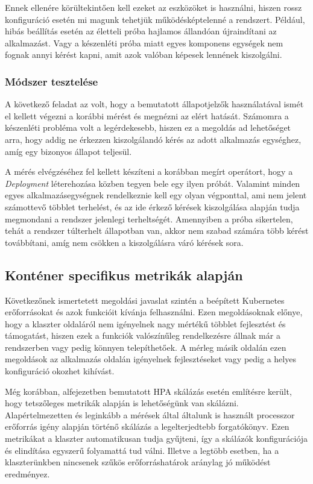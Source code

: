 Ennek ellenére körültekintően kell ezeket az eszközöket is használni, hiszen rossz konfiguráció esetén mi magunk tehetjük működésképtelenné a rendszert.
Például, hibás beállítás esetén az életteli próba hajlamos állandóan újraindítani az alkalmazást. Vagy a készenléti próba miatt egyes komponens egységek nem fognak annyi kérést kapni, amit azok valóban képesek lennének kiszolgálni.

\subsubsection{Módszer tesztelése}
A következő feladat az volt, hogy a bemutatott állapotjelzők használatával ismét el kellett végezni a korábbi mérést és megnézni az elért hatását.
Számomra a készenléti probléma volt a legérdekesebb, hiszen ez a megoldás ad lehetőséget arra, hogy addig ne érkezzen kiszolgálandó kérés az adott alkalmazás egységhez, amíg egy bizonyos állapot teljesül.

A mérés elvégzéséhez fel kellett készíteni a korábban megírt operátort, hogy a \textit{Deployment} léterehozása közben tegyen bele egy ilyen próbát. 
Valamint minden egyes alkalmazásegységnek rendelkeznie kell egy olyan végponttal, ami nem jelent számottevő többlet terhelést, és az ide érkező kérések kiszolgálása alapján tudja megmondani a rendszer jelenlegi terheltségét. 
Amennyiben a próba sikertelen, tehát a rendszer túlterhelt állapotban van, akkor nem szabad számára több kérést továbbítani, amíg nem csökken a kiszolgálásra váró kérések sora.


\subsection{Konténer specifikus metrikák alapján}
\label{subsec:container_metric_scaling}
Következőnek ismertetett megoldási javaslat szintén a beépített Kubernetes erőforrásokat és azok funkcióit kívánja felhasználni.
Ezen megoldásoknak előnye, hogy a klaszter oldaláról nem igényelnek nagy mértékű többlet fejlesztést és támogatást, hiszen ezek a funkciók valószínűleg rendelkezésre állnak már a rendszerben vagy pedig könnyen telepíthetőek.
A mérleg másik oldalán ezen megoldások az alkalmazás oldalán igényelnek fejlesztéseket vagy pedig a helyes konfiguráció okozhet kihívást.

Még korábban,  alfejezetben bemutatott HPA skálázás esetén említésre került, hogy tetszőleges metrikák alapján is lehetőségünk van skálázni.
Alapértelmezetten és leginkább a mérések által általunk is használt processzor erőforrás igény alapján történő skálázás a legelterjedtebb forgatókönyv.
Ezen metrikákat a klaszter automatikusan tudja gyűjteni, így a skálázók konfigurációja és elindítása egyszerű folyamattá tud válni.
Illetve a legtöbb esetben, ha a klaszterünkben nincsenek szűkös erőforráshatárok aránylag jó működést eredményez.


